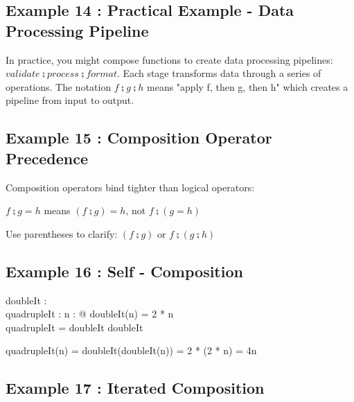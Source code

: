 \documentclass[a4paper,10pt,fleqn]{article}
\begin{document}
\bigskip

\subsection*{Example 14 : Practical Example - Data Processing Pipeline}

\noindent In practice, you might compose functions to create data processing pipelines: $validate \semi process \semi format$. Each stage transforms data through a series of operations. The notation $f \semi g \semi h$ means "apply f, then g, then h" which creates a pipeline from input to output.

\bigskip

\subsection*{Example 15 : Composition Operator Precedence}

\noindent Composition operators bind tighter than logical operators:

\bigskip

\noindent $f \semi g = h$ means $(f \semi g) = h$, not $f \semi (g = h)$

\bigskip

\noindent Use parentheses to clarify: $(f \semi g)$ or $f \semi (g \semi h)$

\bigskip

\subsection*{Example 16 : Self - Composition}

\begin{axdef}
doubleIt : \nat \fun \nat \\
quadrupleIt : \nat \fun \nat
\where
\forall n : \nat @ doubleIt(n) = 2 * n \\
quadrupleIt = doubleIt \comp doubleIt
\end{axdef}

\noindent quadrupleIt(n) = doubleIt(doubleIt(n)) = 2 * (2 * n) = 4n

\bigskip

\subsection*{Example 17 : Iterated Composition}
\end{document}
